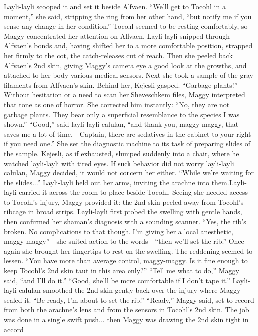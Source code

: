 \documentclass[9pt]{article}
\begin{document}
Layli-layli scooped it and set it beside Alfvaen. “We’ll get to Tocohl in a moment,” she said, stripping
the ring from her other hand, “but notify me if you sense any change in her condition.” Tocohl seemed to
be resting comfortably, so Maggy concentrated her attention on Alfvaen.
Layli-layli snipped through Alfvaen’s bonds and, having shifted her to a more comfortable position,
strapped her firmly to the cot, the catch-releases out of reach. Then she peeled back Alfvaen’s 2nd skin,
giving Maggy’s camera eye a good look at the growths, and attached to her body various medical
sensors. Next she took a sample of the gray filaments from Alfvaen’s skin.
Behind her, Kejesli gasped. “Garbage plants!”
Without hesitation or a need to scan her Sheveschkem files, Maggy interpreted that tone as one of
horror. She corrected him instantly: “No, they are not garbage plants. They bear only a superficial
resemblance to the species I was shown.”
“Good,” said layli-layli calulan, “and thank you, maggy-maggy, that saves me a lot of
time.—Captain, there are sedatives in the cabinet to your right if you need one.” She set the diagnostic
machine to its task of preparing slides of the sample.
Kejesli, as if exhausted, slumped suddenly into a chair, where he watched layli-layli with tired eyes.
If such behavior did not worry layli-layli calulan, Maggy decided, it would not concern her either.
“While we’re waiting for the slides...” Layli-layli held out her arms, inviting the arachne into them.Layli-layli carried it across the room to place beside Tocohl.
Seeing she needed access to Tocohl’s injury, Maggy provided it: the 2nd skin peeled away from
Tocohl’s ribcage in broad strips. Layli-layli first probed the swelling with gentle hands, then confirmed
her shaman’s diagnosis with a sounding scanner. “Yes, the rib’s broken. No complications to that though.
I’m giving her a local anesthetic, maggy-maggy”—she suited action to the words—“then we’ll set the
rib.”
Once again she brought her fingertips to rest on the swelling. The reddening seemed to lessen. “You
have more than average control, maggy-maggy. Is it fine enough to keep Tocohl’s 2nd skin taut in this
area only?”
“Tell me what to do,” Maggy said, “and I’ll do it.”
“Good, she’ll be more comfortable if I don’t tape it.” Layli-layli calulan smoothed the 2nd skin
gently back over the injury where Maggy sealed it. “Be ready, I’m about to set the rib.”
“Ready,” Maggy said, set to record from both the arachne’s lens and from the sensors in Tocohl’s
2nd skin. The job was done in a single swift push... then Maggy was drawing the 2nd skin tight in accord
\end{document}
